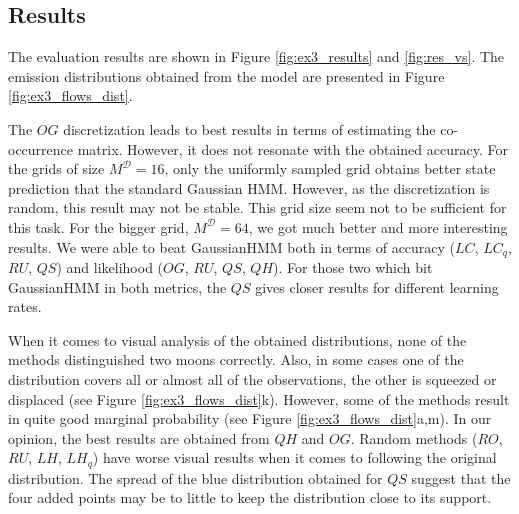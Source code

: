 \documentclass[shortabstract]{iithesis}
\begin{document}

\subsection{Results}

The evaluation results are shown in Figure \ref{fig:ex3_results} and \ref{fig:res_vs}. The emission distributions obtained from the model are presented in Figure \ref{fig:ex3_flows_dist}.

The $OG$ discretization leads to best results in terms of estimating the co-occurrence matrix. However, it does not resonate with the obtained accuracy. For the grids of size $M^{\mathcal D} = 16$, only the uniformly sampled grid obtains better state prediction that the standard Gaussian HMM. However, as the discretization is random, this result may not be stable. This grid size seem not to be sufficient for this task. For the bigger grid, $M^{\mathcal D} = 64$, we got much better and more interesting results. We were able to beat GaussianHMM both in terms of accuracy ($LC$, $LC_q$, $RU$, $QS$) and likelihood ($OG$, $RU$, $QS$, $QH$). For those two which bit GaussianHMM in both metrics, the $QS$ gives closer results for different learning rates. 

When it comes to visual analysis of the obtained distributions, none of the methods distinguished two moons correctly. Also, in some cases one of the distribution covers all or almost all of the observations, the other is squeezed or displaced (see Figure \ref{fig:ex3_flows_dist}k). However, some of the methods result in quite good marginal probability (see Figure \ref{fig:ex3_flows_dist}a,m). In our opinion, the best results are obtained from $QH$ and $OG$. Random methods ($RO$, $RU$, $LH$, $LH_q$) have worse visual results when it comes to following the original distribution. The spread of the blue distribution obtained for $QS$ suggest that the four added points may be to little to keep the distribution close to its support. 


\newpage
\end{document}
